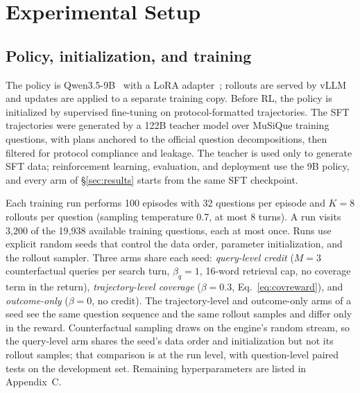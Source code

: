 
\section{Experimental Setup}
\label{sec:setup}

\subsection{Policy, initialization, and training}
\label{sec:setup-model}

The policy is Qwen3.5-9B~\citep{yang2025qwen3} with a LoRA
adapter~\citep{hu2021lora}; rollouts are served by
vLLM~\citep{Kwon2023memory} and updates are applied to a separate training
copy. Before RL, the policy is initialized by supervised fine-tuning on
protocol-formatted trajectories. The SFT trajectories were generated by
a 122B teacher model over MuSiQue training questions, with plans
anchored to the official question decompositions, then filtered for
protocol compliance and leakage. The teacher is used only to generate
SFT data; reinforcement learning, evaluation, and deployment use the 9B
policy, and every arm of \S\ref{sec:results} starts from the same SFT
checkpoint.

Each training run performs 100 episodes with 32 questions per episode
and $K=8$ rollouts per question (sampling temperature 0.7, at most 8
turns). A run visits 3{,}200 of the 19{,}938 available training
questions, each at most once. Runs use explicit random seeds that
control the data order, parameter initialization, and the rollout
sampler. Three arms share each seed: \emph{query-level credit}
($M=3$ counterfactual queries per search turn, $\beta_q=1$, 16-word
retrieval cap, no coverage term in the return), \emph{trajectory-level
coverage} ($\beta=0.3$, Eq.~\ref{eq:covreward}), and
\emph{outcome-only} ($\beta=0$, no credit). The trajectory-level and
outcome-only arms of a seed see the same question sequence and the
same rollout samples and differ only in the reward. Counterfactual
sampling draws on the engine's random stream, so the query-level arm
shares the seed's data order and initialization but not its rollout
samples; that comparison is at the run level, with question-level
paired tests on the development set. Remaining hyperparameters are
listed in Appendix~C.

